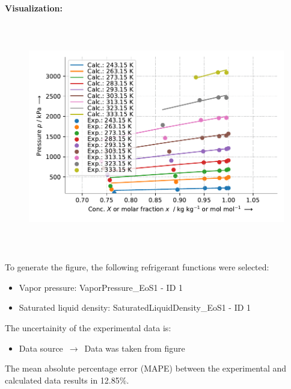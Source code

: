 \textbf{Visualization:}
%
\begin{figure}[!htp]
{\noindent\includegraphics[height=10cm, keepaspectratio]{figs/abs/abs_R-125_lubricant_POE_NrtlFixedDg_1.pdf}}
\end{figure}
%

To generate the figure, the following refrigerant functions were selected:
\begin{itemize}
\item Vapor pressure: VaporPressure\_EoS1 - ID 1
\item Saturated liquid density: SaturatedLiquidDensity\_EoS1 - ID 1
\end{itemize}

The uncertainity of the experimental data is:
\begin{itemize}
\item Data source $\,\to\,$ Data was taken from figure
\end{itemize}

The mean absolute percentage error (MAPE) between the experimental and calculated data results in 12.85\%.
\FloatBarrier
\newpage

